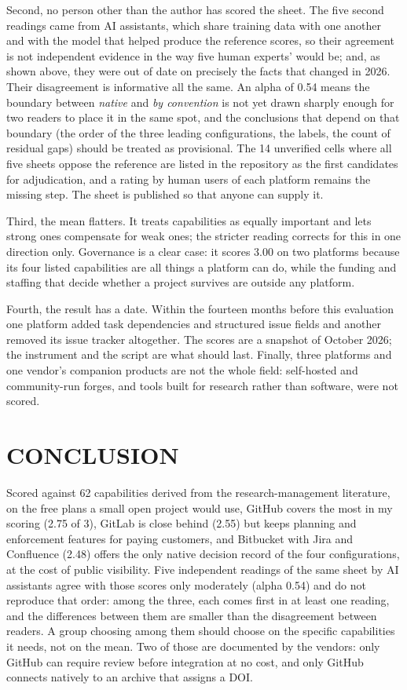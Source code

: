 \documentclass{IEEEcsmag}
\begin{document}
Second, no person other than the author has scored the sheet. The five second readings came from AI assistants, which share training data with one another and with the model that helped produce the reference scores, so their agreement is not independent evidence in the way five human experts' would be; and, as shown above, they were out of date on precisely the facts that changed in 2026. Their disagreement is informative all the same. An alpha of 0.54 means the boundary between \emph{native} and \emph{by convention} is not yet drawn sharply enough for two readers to place it in the same spot, and the conclusions that depend on that boundary (the order of the three leading configurations, the labels, the count of residual gaps) should be treated as provisional. The 14 unverified cells where all five sheets oppose the reference are listed in the repository as the first candidates for adjudication, and a rating by human users of each platform remains the missing step. The sheet is published so that anyone can supply it.

Third, the mean flatters. It treats capabilities as equally important and lets strong ones compensate for weak ones; the stricter reading corrects for this in one direction only. Governance is a clear case: it scores 3.00 on two platforms because its four listed capabilities are all things a platform can do, while the funding and staffing that decide whether a project survives are outside any platform.

Fourth, the result has a date. Within the fourteen months before this evaluation one platform added task dependencies and structured issue fields and another removed its issue tracker altogether. The scores are a snapshot of October 2026; the instrument and the script are what should last. Finally, three platforms and one vendor's companion products are not the whole field: self-hosted and community-run forges, and tools built for research rather than software, were not scored.

\section{CONCLUSION}

Scored against 62 capabilities derived from the research-management literature, on the free plans a small open project would use, GitHub covers the most in my scoring (2.75 of 3), GitLab is close behind (2.55) but keeps planning and enforcement features for paying customers, and Bitbucket with Jira and Confluence (2.48) offers the only native decision record of the four configurations, at the cost of public visibility. Five independent readings of the same sheet by AI assistants agree with those scores only moderately (alpha 0.54) and do not reproduce that order: among the three, each comes first in at least one reading, and the differences between them are smaller than the disagreement between readers. A group choosing among them should choose on the specific capabilities it needs, not on the mean. Two of those are documented by the vendors: only GitHub can require review before integration at no cost, and only GitHub connects natively to an archive that assigns a DOI.
\end{document}
